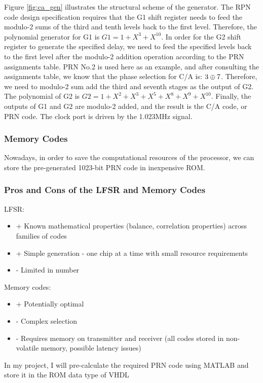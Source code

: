 Figure \ref{fig:ca_gen} illustrates the structural scheme of the generator. The RPN code design specification requires that the G1 shift register needs to feed the modulo-2 sums of the third and tenth levels back to the first level. Therefore, the polynomial generator for G1 is $G1=1+X^3+X^{10}$. In order for the G2 shift register to generate the specified delay, we need to feed the specified levels back to the first level after the modulo-2 addition operation according to the PRN assignments table. PRN No.2 is used here as an example, and after consulting the assignments table\cite{RN170}, we know that the phase selection for C/A is: $3\oplus 7$. Therefore, we need to modulo-2 sum add the third and seventh stages as the output of G2. The polynomial of G2 is $G2=1+X^2+X^3+X^5+X^8+X^9+X^{10}$. Finally, the outputs of G1 and G2 are modulo-2 added, and the result is the C/A code, or PRN  code. The clock port is driven by the 1.023MHz signal.

\subsubsection{Memory Codes}
Nowadays, in order to save the computational resources of the processor, we can store the pre-generated \num{1023}-bit PRN code in inexpensive ROM.

\subsubsection{Pros and Cons of the LFSR and Memory Codes}
LFSR:
\begin{itemize}
    \item + Known mathematical properties (balance, correlation properties) across families of codes
    \item + Simple generation - one chip at a time with small resource requirements
    \item - Limited in number
\end{itemize}
Memory codes:
\begin{itemize}
    \item + Potentially optimal
    \item - Complex selection
    \item - Requires memory on transmitter and receiver (all codes stored in non-volatile memory, possible latency issues)
\end{itemize}

In my project, I will pre-calculate the required PRN code using MATLAB and store it in the ROM data type of VHDL


